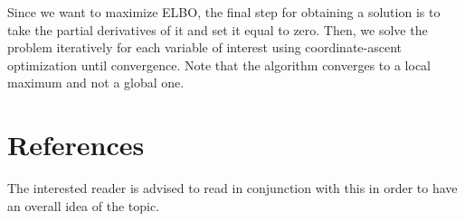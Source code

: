Since we want to maximize ELBO,
the final step for obtaining a solution is to take the partial derivatives of it and set it equal to zero.
Then, we solve the problem iteratively for each variable of interest using coordinate-ascent optimization until convergence.
Note that the algorithm converges to a local maximum and not a global one.

\section{References}
The interested reader is advised to read \cite{Blei_2017} in conjunction with this in order to have an overall idea of the topic.